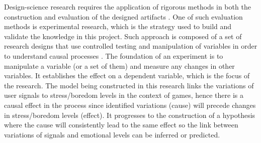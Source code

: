 
Design-science research requires the application of rigorous methods in both the construction and evaluation of the designed artifacts \parencite{hevner2004design, johannesson2014introduction, oates2005researching}. One of such evaluation methods is experimental research, which is the strategy used to build and validate the knowledge in this project. Such approach is composed of a set of research designs that use controlled testing and manipulation of variables in order to understand causal processes \parencite{robson2016real}. The foundation of an experiment is to manipulate a variable (or a set of them) and measure any changes in other variables. It establishes the effect on a dependent variable, which is the focus of the research. The model being constructed in this research links the variations of user signals to stress/boredom levels in the context of games, hence there is a causal effect in the process since identified variations (cause) will precede changes in stress/boredom levels (effect). It progresses to the construction of a hypothesis where the cause will consistently lead to the same effect so the link between variations of signals and emotional levels can be inferred or predicted.

